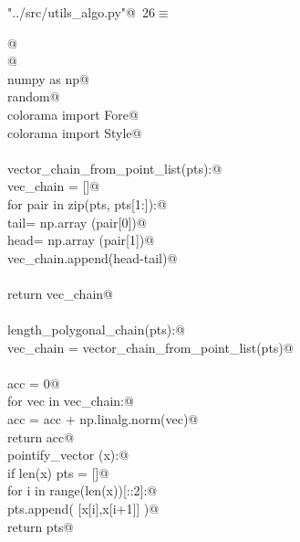 \documentclass[10.0pt]{report}
\begin{document}
\begin{appendices}
\begin{flushleft} \small\label{scrap11}\raggedright\small
{} \verb@"../src/utils_algo.py"@\nobreak\ {\footnotesize {26}}$\equiv$
\vspace{-1ex}
\begin{list}{}{} \item
\mbox{}\verb@    @\\
\mbox{}\verb@ @\\
\mbox{}\verb@import numpy as np@\\
\mbox{}\verb@import random@\\
\mbox{}\verb@from colorama import Fore@\\
\mbox{}\verb@from colorama import Style@\\
\mbox{}\verb@@\\
\mbox{}\verb@def vector_chain_from_point_list(pts):@\\
\mbox{}\verb@    vec_chain = []@\\
\mbox{}\verb@    for pair in zip(pts, pts[1:]):@\\
\mbox{}\verb@        tail= np.array (pair[0])@\\
\mbox{}\verb@        head= np.array (pair[1])@\\
\mbox{}\verb@        vec_chain.append(head-tail)@\\
\mbox{}\verb@@\\
\mbox{}\verb@    return vec_chain@\\
\mbox{}\verb@@\\
\mbox{}\verb@def length_polygonal_chain(pts):@\\
\mbox{}\verb@    vec_chain = vector_chain_from_point_list(pts)@\\
\mbox{}\verb@@\\
\mbox{}\verb@    acc = 0@\\
\mbox{}\verb@    for vec in vec_chain:@\\
\mbox{}\verb@        acc = acc + np.linalg.norm(vec)@\\
\mbox{}\verb@    return acc@\\
\mbox{}\verb@def pointify_vector (x):@\\
\mbox{}\verb@    if len(x) % 2 == 0:@\\
\mbox{}\verb@        pts = []@\\
\mbox{}\verb@        for i in range(len(x))[::2]:@\\
\mbox{}\verb@            pts.append( [x[i],x[i+1]] )@\\
\mbox{}\verb@        return pts@\\

\end{list}
\end{flushleft}
\end{appendices}
\end{document}

